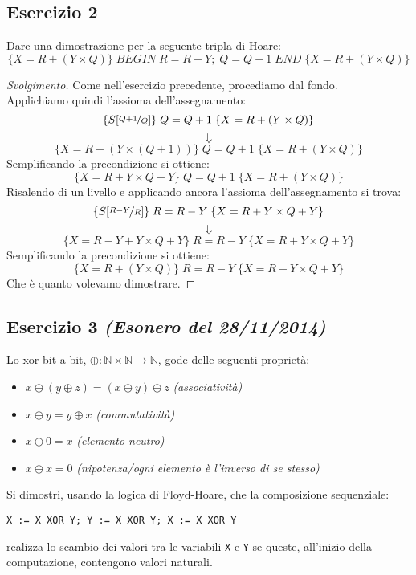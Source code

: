 \documentclass[a4paper, 10pt]{article} %
\begin{document}
\subsection{Esercizio 2}
Dare una dimostrazione per la seguente tripla di Hoare:
$$ \{X=R+(Y \times Q) \} \; BEGIN \; R=R-Y; \; Q=Q+1 \; END \; \{X=R+(Y \times Q)\} $$

\begin{proof}[Svolgimento]
Come nell'esercizio precedente, procediamo dal fondo.\\
Applichiamo quindi l'assioma dell'assegnamento:
$$ \{S[\nicefrac{Q+1}{Q}] \} \; Q=Q+1 \; \{X=R+(Y \times Q)\} $$
$$ \Downarrow $$
$$ \{X=R+(Y \times (Q+1)) \} \; Q=Q+1 \; \{X=R+(Y \times Q)\} $$
Semplificando la precondizione si ottiene:
$$ \{X=R+Y \times Q + Y \} \; Q=Q+1 \; \{X=R+(Y \times Q)\} $$
Risalendo di un livello e applicando ancora l'assioma dell'assegnamento si trova:
$$ \{S[\nicefrac{R-Y}{R}] \} \; R=R-Y \; \{X=R+Y \times Q + Y \} $$
$$ \Downarrow $$
$$ \{X= R-Y+Y \times Q+Y \} \; R=R-Y \; \{X=R+Y \times Q + Y \} $$
Semplificando la precondizione si ottiene:
$$ \{X= R+(Y \times Q) \} \; R=R-Y \; \{X=R+Y \times Q + Y \} $$
Che è quanto volevamo dimostrare.
\end{proof}

\subsection{Esercizio 3 \emph{(Esonero del 28/11/2014)}}
Lo xor bit a bit, $ \oplus: \mathbb{N} \times \mathbb{N} \rightarrow \mathbb{N} $, gode delle
seguenti proprietà:
\begin{itemize}
	\item $ x \oplus (y \oplus z) = (x \oplus y) \oplus z $ \emph{(associatività)}
	\item $ x \oplus y = y \oplus x $ \emph{(commutatività)}
	\item $ x \oplus 0 = x $ \emph{(elemento neutro)}
	\item $ x \oplus x = 0 $ \emph{(nipotenza/ogni elemento è l'inverso di se stesso)}
\end{itemize}
Si dimostri, usando la logica di Floyd-Hoare, che la composizione sequenziale:
\begin{center}
\texttt{X := X XOR Y; Y := X XOR Y; X := X XOR Y}
\end{center}
realizza lo scambio dei valori tra le variabili \texttt{X} e \texttt{Y} se queste, all'inizio della computazione, contengono valori naturali.
\end{document}

